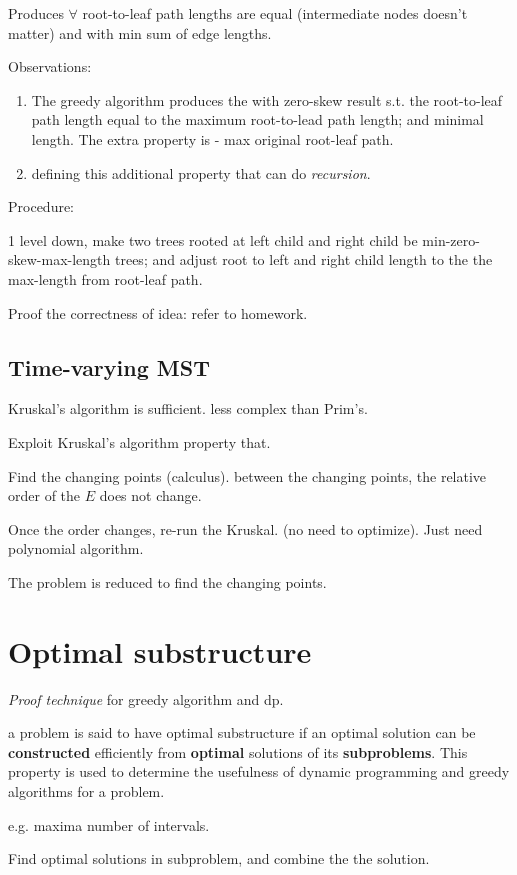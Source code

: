 \documentclass[a4paper]{report}
\theoremstyle{definition}
\begin{document}
Produces $\forall$ root-to-leaf path lengths are equal (intermediate nodes doesn't matter) and with min sum of edge lengths.

Observations:
\begin{enumerate}
\item The greedy algorithm produces the with zero-skew result s.t. the root-to-leaf path length equal to the maximum root-to-lead path length; and minimal length. The extra property is - max original root-leaf path.
\item defining this additional property that can do \textit{recursion}.
\end{enumerate}

Procedure:

1 level down, make two trees rooted at left child and right child be min-zero-skew-max-length trees; and adjust root to left and right child length to the the max-length from root-leaf path.


Proof the correctness of idea: refer to homework.

\subsection{Time-varying MST}
Kruskal's algorithm is sufficient. less complex than Prim's.

Exploit Kruskal's algorithm property that.

Find the changing points (calculus). between the changing points, the relative order of the $E$ does not change.

Once the order changes, re-run the Kruskal. (no need to optimize). Just need polynomial algorithm.

The problem is reduced to find the changing points.


\section{Optimal substructure}
\textit{Proof technique} for greedy algorithm and dp.

a problem is said to have optimal substructure if an optimal solution can be \textbf{constructed} efficiently from \textbf{optimal} solutions of its \textbf{subproblems}. This property is used to determine the usefulness of dynamic programming and greedy algorithms for a problem.

e.g. maxima number of intervals.

Find optimal solutions in subproblem, and combine the the solution.
\end{document}

